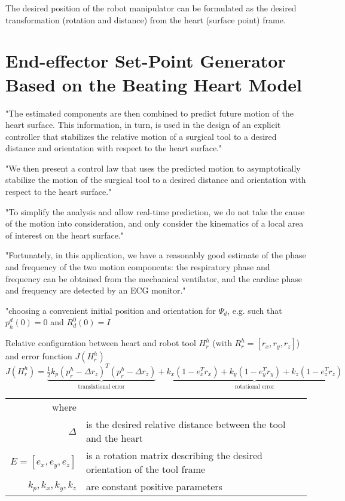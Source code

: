 The desired position of the robot manipulator can be formulated as the desired transformation (rotation and distance) from the heart (surface point) frame.


\section{End-effector Set-Point Generator Based on the Beating Heart Model}
"The estimated components are then combined to predict future motion of the heart surface. This information, in turn, is used in the design of an explicit controller that stabilizes the relative motion of a surgical tool to a desired distance and orientation with respect to the heart surface."

"We then present a control law that uses the predicted motion to asymptotically stabilize the motion of the surgical tool to a desired distance and orientation with respect to the heart surface."

"To simplify the analysis and allow real-time prediction, we do not take the cause of the motion into consideration, and only consider the kinematics of a local area of interest on the heart surface."

"Fortunately, in this application, we have a reasonably good estimate of the phase and frequency of the two motion components: the respiratory phase and frequency can be obtained from the mechanical ventilator, and the cardiac phase and frequency are detected by an ECG monitor."

"choosing a convenient initial position and orientation for $\Psi_d$, e.g. such that $p^d_h(0)=0$ and $R^0_d(0) = I$

Relative configuration between heart and robot tool $H^h_r$ (with $R^h_r =[r_x, r_y, r_z]$) and error function $J(H^h_r)$
\begin{equation}
J(H^h_r) = \underbrace{\tfrac{1}{2}k_p (p^h_r-\Delta r_z)^T(p^h_r-\Delta r_z)}_\text{translational error} + \underbrace{k_x (1-e_x^T r_x) + k_y (1-e_y^T r_y) + k_z (1-e_z^T r_z)}_\text{rotational error}
\end{equation}
\begin{tabular}{rl}
	where &\\
	$\Delta$ & is the desired relative distance between the tool and the heart\\
	$E=[e_x,e_y,e_z]$ & is a rotation matrix describing the desired orientation of the tool frame\\
	$k_p,k_x,k_y,k_z$ & are constant positive parameters\\
\end{tabular}\\

